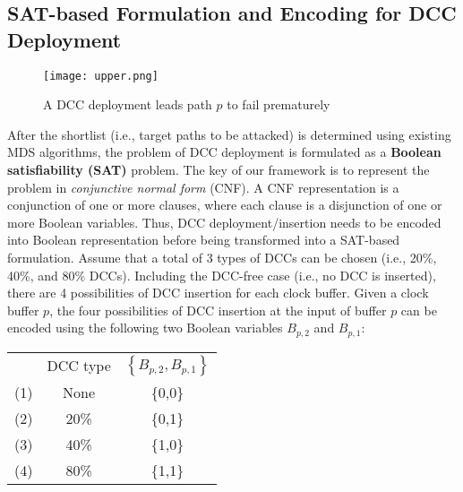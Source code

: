 \subsection{SAT-based Formulation and Encoding for DCC Deployment}
\label{sec:frame:sat}
\begin{comment}
	\begin{figure*}[!ht]
    	\centering
    	\subfigure[A DCC deployment leads path $p$ to fail prematurely]{
    		\label{fig:sub:upper}
        		\texttt{[image: upper.png]}
    	}
   	\hspace{0.1cm}
    	\subfigure[A DCC deployment leads path $p$ to fail post-maturely]{
    		\label{fig:sub:lower}
        		\texttt{[image: lower.png]}
    	}
    	\caption{Illustrative example for the proposed framework based on DCC deployment/insertion}
    	\label{fig:en}
	\end{figure*}
\end{comment}
\begin{figure}
    	\centering
        	\texttt{[image: upper.png]}
       	\caption{A DCC deployment leads path $p$ to fail prematurely}
    	\label{fig:sec:prefail}
\end{figure}
After the shortlist (i.e., target paths to be attacked) is determined using existing MDS algorithms, the problem of DCC deployment is formulated as a \textbf{Boolean satisfiability (SAT)} problem. %
The key of our framework is to represent the problem in \textit{conjunctive normal form} (CNF). A CNF representation is a conjunction of one or more clauses, where each clause is a disjunction of one or more Boolean variables. Thus, DCC deployment/insertion needs to be encoded into Boolean representation before being transformed into a SAT-based formulation. Assume that a total of 3 types of DCCs can be chosen (i.e., 20\%, 40\%, and 80\% DCCs). Including the DCC-free case (i.e., no DCC is inserted), there are 4 possibilities of DCC insertion for each clock buffer. Given a clock buffer $p$, the four possibilities of DCC insertion at the input of buffer $p$ can be encoded using the  following two Boolean variables $B_{p,2}$ and $B_{p,1}$:

{\small
\begin{tabular}{ c c c }
   & DCC type & $\left\{B_{p,2},B_{p,1}\right\}$ \\
  (1)\quad & None & \{0,0\} \\
  (2)\quad & 20\% &  \{0,1\} \\
  (3)\quad & 40\% &  \{1,0\} \\
  (4)\quad & 80\% &  \{1,1\} \\
\end{tabular}}

